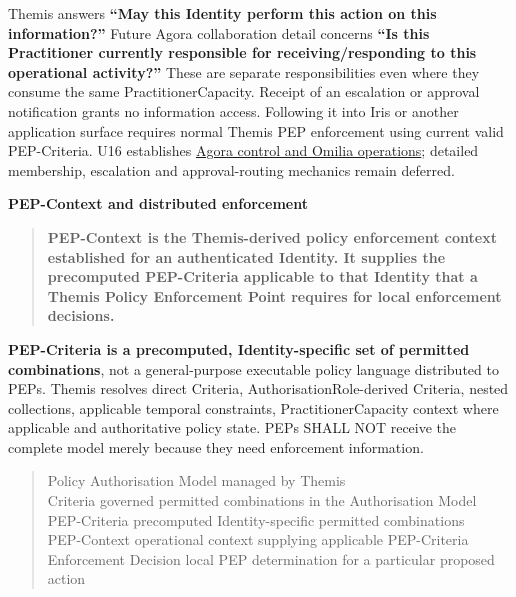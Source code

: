 Themis answers \textbf{“May this Identity perform this action on this information?”}
Future Agora collaboration detail concerns \textbf{“Is this Practitioner currently
responsible for receiving/responding to this operational activity?”} These are
separate responsibilities even where they consume the same PractitionerCapacity.
Receipt of an escalation or approval notification grants no information access.
Following it into Iris or another application surface requires normal Themis PEP
enforcement using current valid PEP-Criteria. U16 establishes
\hyperref[element:d1c4053e68384080b8eb79d2008632ba]{Agora control and Omilia operations};
detailed membership, escalation and approval-routing mechanics remain deferred.







\par\medskip\textbf{PEP-Context and distributed enforcement}\par


\begin{quote}


\textbf{PEP-Context is the Themis-derived policy enforcement context established for
an authenticated Identity. It supplies the precomputed PEP-Criteria applicable
to that Identity that a Themis Policy Enforcement Point requires for local
enforcement decisions.}



\end{quote}


\textbf{PEP-Criteria is a precomputed, Identity-specific set of permitted combinations},
not a general-purpose executable policy language distributed to PEPs. Themis
resolves direct Criteria, AuthorisationRole-derived Criteria, nested collections,
applicable temporal constraints, PractitionerCapacity context where applicable
and authoritative policy state. PEPs SHALL NOT receive the complete model merely
because they need enforcement information.



\begin{quote}\small\ttfamily
Policy                Authorisation Model managed by Themis\\
Criteria              governed permitted combinations in the Authorisation Model\\
PEP-Criteria          precomputed Identity-specific permitted combinations\\
PEP-Context           operational context supplying applicable PEP-Criteria\\
Enforcement Decision  local PEP determination for a particular proposed action\\

\end{quote}


